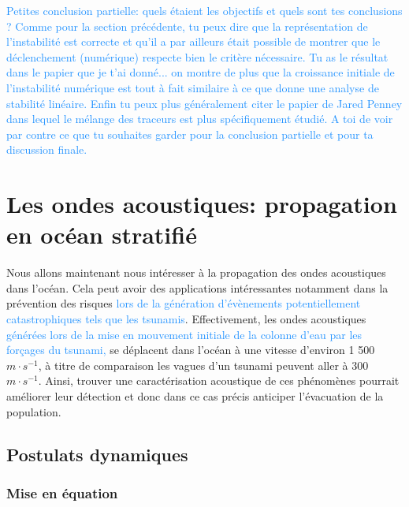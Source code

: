 \documentclass{rapportECC}
\newcommand{\FAadd}[1]{\textcolor{DodgerBlue}{{#1}}}                     %
\begin{document}
\FAadd{Petites conclusion partielle: quels étaient les objectifs et quels sont tes conclusions ? Comme pour la section précédente, tu peux dire que la représentation de l'instabilité est correcte et qu'il a par ailleurs était possible de montrer que le déclenchement (numérique) respecte bien le critère nécessaire. Tu as le résultat dans le papier que je t'ai donné... on montre de plus que la croissance initiale de l'instabilité numérique est tout à fait similaire à ce que donne une analyse de stabilité linéaire. Enfin tu peux plus généralement citer le papier de Jared Penney dans lequel le mélange des traceurs est plus spécifiquement étudié. A toi de voir par contre ce que tu souhaites garder pour la conclusion partielle et pour ta discussion finale.}\\






\section{Les ondes acoustiques: propagation en océan stratifié}

Nous allons maintenant nous intéresser à la propagation des ondes acoustiques dans l'océan. Cela peut avoir des applications intéressantes notamment dans la prévention des risques \FAadd{lors de la génération d'évènements potentiellement catastrophiques tels que les tsunamis}. Effectivement, les ondes acoustiques \FAadd{générées lors de la mise en mouvement initiale de la colonne d'eau par les forçages du tsunami,} se déplacent dans l'océan à une vitesse d'environ 1 500 $m \cdot s^{-1}$, à titre de comparaison les vagues d'un tsunami peuvent aller à 300 $m \cdot s^{-1}$. Ainsi, trouver une caractérisation acoustique de ces phénomènes pourrait améliorer leur détection et donc dans ce cas précis anticiper l'évacuation de la population.

\subsection{Postulats dynamiques}
\subsubsection{Mise en équation}
\end{document}
